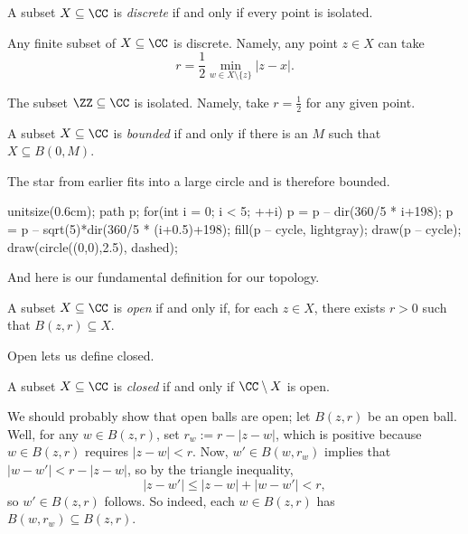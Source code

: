 \begin{definition}[Discrete]
	A subset $X\subseteq\CC$ is \textit{discrete} if and only if every point is isolated.
\end{definition}
\begin{example}
	Any finite subset of $X\subseteq\CC$ is discrete. Namely, any point $z\in X$ can take
	\[r=\frac12\min_{w\in X\setminus\{z\}}|z-x|.\]
\end{example}
\begin{example}
	The subset $\ZZ\subseteq\CC$ is isolated. Namely, take $r=\frac12$ for any given point.
\end{example}
\begin{definition}[Bounded]
	A subset $X\subseteq\CC$ is \textit{bounded} if and only if there is an $M$ such that $X\subseteq B(0,M)$.
\end{definition}
\begin{example}
	The star from earlier fits into a large circle and is therefore bounded.
	\begin{center}
		\begin{asy}
			unitsize(0.6cm);
			path p;
			for(int i = 0; i < 5; ++i)
			{
				p = p -- dir(360/5 * i+198);
				p = p -- sqrt(5)*dir(360/5 * (i+0.5)+198);
			}
			fill(p -- cycle, lightgray);
			draw(p -- cycle);
			draw(circle((0,0),2.5), dashed);
		\end{asy}
	\end{center}
\end{example}
And here is our fundamental definition for our topology.
\begin{defi}[Open]
	A subset $X\subseteq\CC$ is \textit{open} if and only if, for each $z\in X$, there exists $r>0$ such that $B(z,r)\subseteq X$.
\end{defi}
Open lets us define closed.
\begin{definition}[Closed]
	A subset $X\subseteq\CC$ is \textit{closed} if and only if $\CC\setminus X$ is open.
\end{definition}
\begin{remark}[Nir]
	We should probably show that open balls are open; let $B(z,r)$ be an open ball. Well, for any $w\in B(z,r)$, set $r_w:=r-|z-w|$, which is positive because $w\in B(z,r)$ requires $|z-w|<r$. Now, $w'\in B(w,r_w)$ implies that $|w-w'|<r-|z-w|$, so by the triangle inequality,
	\[|z-w'|\le|z-w|+|w-w'|<r,\]
	so $w'\in B(z,r)$ follows. So indeed, each $w\in B(z,r)$ has $B(w,r_w)\subseteq B(z,r)$.
\end{remark}

